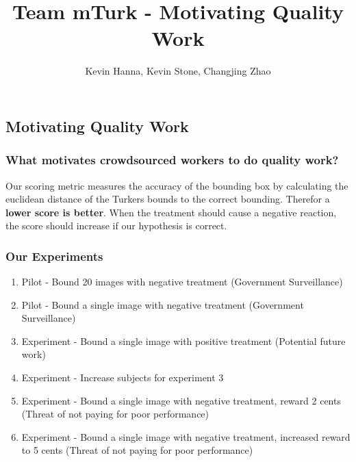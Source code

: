 \documentclass[
]{article}
\title{Team mTurk - Motivating Quality Work}
\author{Kevin Hanna, Kevin Stone, Changjing Zhao}
\date{}
\providecommand{\tightlist}{%
  \setlength{\itemsep}{0pt}\setlength{\parskip}{0pt}}
\begin{document}
\maketitle

{
\setcounter{tocdepth}{2}
\tableofcontents
}
\hypertarget{motivating-quality-work}{%
\subsection{Motivating Quality Work}\label{motivating-quality-work}}

\hypertarget{what-motivates-crowdsourced-workers-to-do-quality-work}{%
\subsubsection{What motivates crowdsourced workers to do quality
work?}\label{what-motivates-crowdsourced-workers-to-do-quality-work}}

Our scoring metric measures the accuracy of the bounding box by
calculating the euclidean distance of the Turkers bounds to the correct
bounding. Therefor a \textbf{lower score is better}. When the treatment
should cause a negative reaction, the score should increase if our
hypothesis is correct.

\hypertarget{our-experiments}{%
\subsubsection{Our Experiments}\label{our-experiments}}

\begin{enumerate}
\def\labelenumi{\arabic{enumi}.}
\tightlist
\item
  Pilot - Bound 20 images with negative treatment (Government
  Surveillance)
\item
  Pilot - Bound a single image with negative treatment (Government
  Surveillance)
\item
  Experiment - Bound a single image with positive treatment (Potential
  future work)
\item
  Experiment - Increase subjects for experiment 3
\item
  Experiment - Bound a single image with negative treatment, reward 2
  cents (Threat of not paying for poor performance)
\item
  Experiment - Bound a single image with negative treatment, increased
  reward to 5 cents (Threat of not paying for poor performance)
\end{enumerate}
\end{document}
